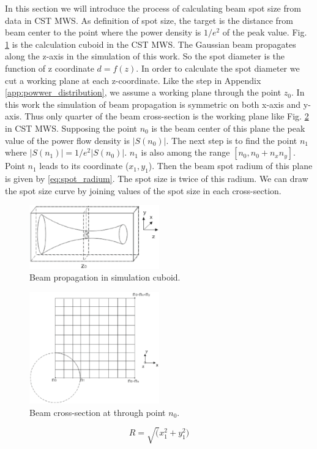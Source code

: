 In this section we will introduce the process of calculating beam spot size from data in CST MWS. As definition of spot size, the target is the distance from beam center to the point where the power density is $1/e^{2}$ of the peak value.  Fig. \ref{Afig:beam_cuboid} is the calculation cuboid in the CST MWS. The Gaussian beam propagates along the z-axis in the simulation of this work. So the spot diameter is the function of z coordinate $d=f(z)$. In order to calculate the spot diameter we cut a working plane at each z-coordinate. Like the step in Appendix \ref{app:powwer_distribution}, we assume a working plane through the point $z_{0}$. In this work the simulation of beam propagation is symmetric on both x-axis and y-axis. Thus only quarter of the beam cross-section is the working plane like Fig. \ref{Afig:beam_crosssection} in CST MWS. Supposing the point $n_{0}$ is the beam center of this plane the peak value of the power flow density is $|S(n_{0})|$. The next step is to find the point $n_{1}$ where $|S(n_{1})|=1/e^{2}|S(n_{0})|$. $n_{1}$ is also among the range $[n_{0}, n_{0}+n_{x}n_{y}]$. Point $n_{1}$ leads to its coordinate ($x_{1},y_{1}$). Then the beam spot radium of this plane is given by \ref{eq:spot_radium}. The spot size is twice of this radium. We can draw the spot size curve by joining values of the spot size in each cross-section.
\begin{figure}[!ht]
\centering
\includegraphics[width=0.5\textwidth]{bilder/beam_cuboid}
\caption{Beam propagation in simulation cuboid.}
\label{Afig:beam_cuboid}
\end{figure}
\begin{figure}[!ht]
\centering
\includegraphics[width=0.5\textwidth]{bilder/beam_crosssection}
\caption{Beam cross-section at through point $n_{0}$.}
\label{Afig:beam_crosssection}
\end{figure}
\begin{equation}
R=\sqrt(x_{1}^{2}+y_{1}^{2})
\label{eq:spot_radium}
\end{equation} 
